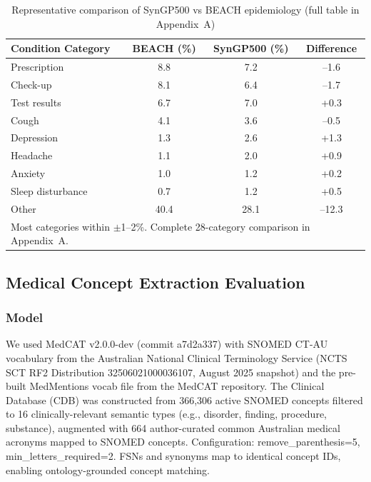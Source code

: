 \documentclass[11pt]{article}
\begin{document}
\begin{table}[h]
\centering
\footnotesize
\setlength{\tabcolsep}{4pt}
\caption{Representative comparison of SynGP500 vs BEACH epidemiology (full table in Appendix~A)}
\begin{tabular}{lccc}
\toprule
\textbf{Condition Category} & \textbf{BEACH (\%)} & \textbf{SynGP500 (\%)} & \textbf{Difference} \\
\midrule
Prescription & 8.8 & 7.2 & –1.6 \\
Check-up & 8.1 & 6.4 & –1.7 \\
Test results & 6.7 & 7.0 & +0.3 \\
Cough & 4.1 & 3.6 & –0.5 \\
Depression & 1.3 & 2.6 & +1.3 \\
Headache & 1.1 & 2.0 & +0.9 \\
Anxiety & 1.0 & 1.2 & +0.2 \\
Sleep disturbance & 0.7 & 1.2 & +0.5 \\
Other & 40.4 & 28.1 & –12.3 \\
\bottomrule
\multicolumn{4}{l}{\footnotesize Most categories within $\pm$1--2\%. Complete 28-category comparison in Appendix~A.}
\end{tabular}
\label{tab:beach}
\end{table}

\subsection{Medical Concept Extraction Evaluation}

\subsubsection{Model}
We used MedCAT \cite{medcat} v2.0.0-dev (commit a7d2a337) with SNOMED CT-AU \cite{snomed} vocabulary from the Australian National Clinical Terminology Service (NCTS SCT RF2 Distribution 32506021000036107, August 2025 snapshot) and the pre-built MedMentions vocab file from the MedCAT repository. The Clinical Database (CDB) was constructed from 366,306 active SNOMED concepts filtered to 16 clinically-relevant semantic types (e.g., disorder, finding, procedure, substance), augmented with 664 author-curated common Australian medical acronyms mapped to SNOMED concepts. Configuration: remove\_parenthesis=5, min\_letters\_required=2. FSNs and synonyms map to identical concept IDs, enabling ontology-grounded concept matching.
\end{document}
